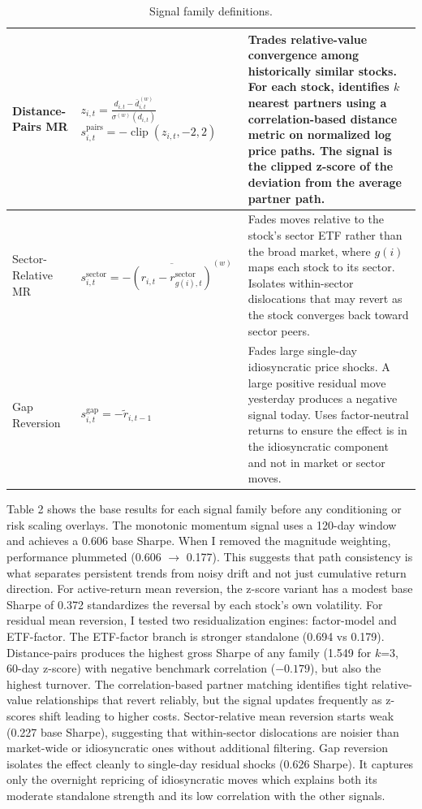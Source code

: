 \begin{table}[H]
\begin{tabular}{p{2.8cm} >{\raggedright\arraybackslash}p{4.5cm} >{\raggedright\arraybackslash}p{7cm}}
        \midrule
        Distance-Pairs MR &
        $z_{i,t} = \frac{d_{i,t} - \bar{d}^{(w)}_{i,t}}{\sigma^{(w)}(d_{i,t})}$ \newline\newline $s^{\text{pairs}}_{i,t} = -\operatorname{clip}(z_{i,t}, -2, 2)$ &
        Trades relative-value convergence among historically similar stocks. For each stock, identifies $k$ nearest partners using a correlation-based distance metric on normalized log price paths. The signal is the clipped z-score of the deviation from the average partner path. \\
        \midrule
        Sector-Relative MR &
        $s^{\text{sector}}_{i,t} = -\overline{(r_{i,t} - r^{\text{sector}}_{g(i),t})}^{(w)}$ &
        Fades moves relative to the stock's sector ETF rather than the broad market, where $g(i)$ maps each stock to its sector. Isolates within-sector dislocations that may revert as the stock converges back toward sector peers. \\
        \midrule
        Gap Reversion &
        $s^{\text{gap}}_{i,t} = -\tilde{r}_{i,t-1}$ &
        Fades large single-day idiosyncratic price shocks. A large positive residual move yesterday produces a negative signal today. Uses factor-neutral returns to ensure the effect is in the idiosyncratic component and not in market or sector moves. \\
        \bottomrule
    \end{tabular}
    \caption{Signal family definitions.}
\end{table}

Table 2 shows the base results for each signal family before any conditioning or risk scaling overlays. The monotonic momentum signal uses a 120-day window and achieves a 0.606 base Sharpe. When I removed the magnitude weighting, performance plummeted (0.606 $\to$ 0.177). This suggests that path consistency is what separates persistent trends from noisy drift and not just cumulative return direction. For active-return mean reversion, the z-score variant has a modest base Sharpe of 0.372 standardizes the reversal by each stock's own volatility. For residual mean reversion, I tested two residualization engines: factor-model and ETF-factor. The ETF-factor branch is stronger standalone (0.694 vs 0.179). Distance-pairs produces the highest gross Sharpe of any family (1.549 for $k$=3, 60-day z-score) with negative benchmark correlation ($-0.179$), but also the highest turnover. The correlation-based partner matching identifies tight relative-value relationships that revert reliably, but the signal updates frequently as z-scores shift leading to higher costs. Sector-relative mean reversion starts weak (0.227 base Sharpe), suggesting that within-sector dislocations are noisier than market-wide or idiosyncratic ones without additional filtering. Gap reversion isolates the effect cleanly to single-day residual shocks (0.626 Sharpe). It captures only the overnight repricing of idiosyncratic moves which explains both its moderate standalone strength and its low correlation with the other signals.

